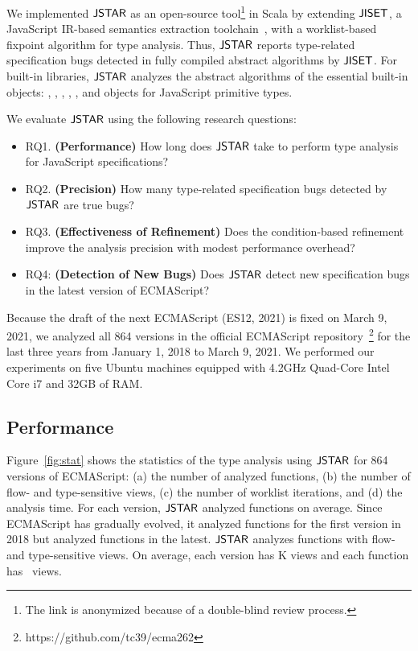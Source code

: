 We implemented $\tool$ as an open-source tool\footnote{The link is anonymized
because of a double-blind review process.} in Scala by extending $\jiset$, a
JavaScript IR-based semantics extraction toolchain~\cite{jiset}, with a worklist-based
fixpoint algorithm for type analysis. Thus, $\tool$ reports type-related specification bugs
detected in fully compiled abstract algorithms by $\jiset$.  For built-in libraries,
$\tool$ analyzes the abstract algorithms of the essential built-in objects: ,
, , , , and objects
for JavaScript primitive types.

We evaluate $\tool$ using the following research questions:
\begin{itemize}
  \item RQ1. \textbf{(Performance)} How long does $\tool$ take to perform type
    analysis for JavaScript specifications?
  \item RQ2. \textbf{(Precision)} How many type-related specification bugs
    detected by $\tool$ are true bugs?
  \item RQ3. \textbf{(Effectiveness of Refinement)} Does the condition-based refinement
    improve the analysis precision with modest performance overhead?
  \item RQ4: \textbf{(Detection of New Bugs)} Does $\tool$ detect new
    specification bugs in the latest version of ECMAScript?
\end{itemize}
Because the draft of the next ECMAScript (ES12, 2021) is fixed on March 9,
2021, we analyzed all 864 versions in the official
ECMAScript repository~\footnote{https://github.com/tc39/ecma262} for the last
three years from January 1, 2018 to March 9, 2021.  We performed our experiments
on five Ubuntu machines equipped with 4.2GHz Quad-Core Intel Core i7 and 32GB of
RAM.


\subsection{Performance}\label{sec:performance}

Figure~\ref{fig:stat} shows the statistics of the type analysis using $\tool$ for
864 versions of ECMAScript: (a) the number of analyzed functions, (b) the number
of flow- and type-sensitive views, (c) the number of worklist iterations, and
(d) the analysis time.  For each version, $\tool$ analyzed
 functions on average.  Since ECMAScript has gradually evolved,
it analyzed  functions for the first version in 2018
but analyzed  functions in the latest.
$\tool$ analyzes functions with flow- and type-sensitive views.
On average, each version has K views and each function has
~views.

